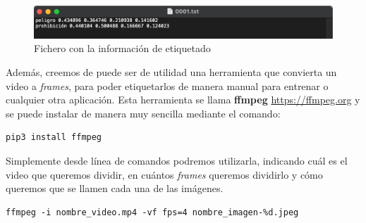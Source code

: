 \begin{figure}[H]
	\centering
	\includegraphics[width=\textwidth]{Imagenes/AnexoI_Manual/AA/etiquetado4.pdf}
	\caption{Fichero con la información de etiquetado}
	\label{etique4}
\end{figure}

Además, creemos de puede ser de utilidad una herramienta que convierta un video a \textit{frames}, para poder etiquetarlos de manera manual para entrenar o cualquier otra aplicación. Esta herramienta se llama \textbf{ffmpeg} \url{https://ffmpeg.org} y se puede instalar de manera muy sencilla mediante el comando: 

\begin{lstlisting}
pip3 install ffmpeg 
\end{lstlisting}

Simplemente desde línea de comandos podremos utilizarla, indicando cuál es el video que queremos dividir, en cuántos \textit{frames} queremos dividirlo y cómo queremos que se llamen cada una de las imágenes. 

\begin{lstlisting}
ffmpeg -i nombre_video.mp4 -vf fps=4 nombre_imagen-%d.jpeg
\end{lstlisting}
